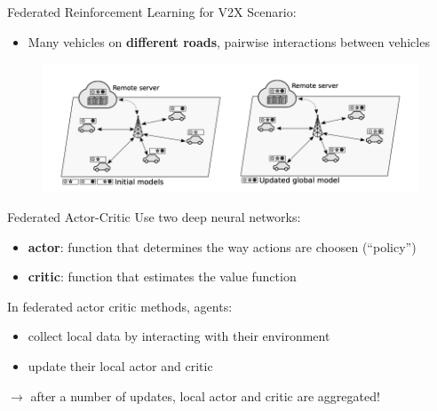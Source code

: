 \documentclass[aspectratio=169,12pt]{beamer}
\begin{document}
\begin{frame}[fragile]{Federated Reinforcement Learning for V2X}
  Scenario:
  \begin{itemize}
  \item Many vehicles on \textcolor{beamer@blendedblue}{\textbf{different roads}}, pairwise interactions between vehicles
  \end{itemize}

  \vspace{-1.5em}
        
  \begin{figure}
    \centering
    \includegraphics[scale=0.4]{images/grid.png}
  \end{figure}

  
  \vspace{0.5em}

\end{frame}

\begin{frame}{Federated Actor-Critic}
  Use two deep neural networks:
  \begin{itemize}
  \item \textcolor{beamer@blendedblue}{\textbf{actor}}: function that determines the way actions are choosen (``policy'')
  \item \textcolor{beamer@blendedblue}{\textbf{critic}}: function that estimates the value function
  \end{itemize}

  In federated actor critic methods, agents:
  \begin{itemize}
  \item collect local data by interacting with their environment
  \item update their local actor and critic
  \end{itemize}

  $\rightarrow$ after a number of updates, local actor and critic are aggregated!

  \vspace{1.5em}
\end{frame}
\end{document}
